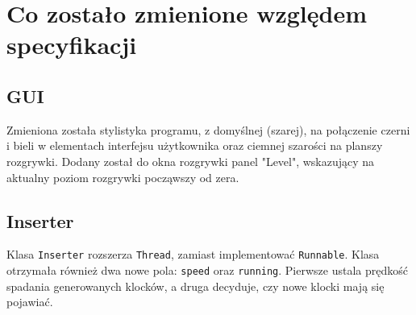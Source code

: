 \documentclass[12pt]{report}
\newcommand{\code}[1]{\texttt{#1}}
\begin{document}
\section{Co zostało zmienione względem specyfikacji}
    
    \subsection{GUI}
      Zmieniona została stylistyka programu, z domyślnej (szarej), na połączenie czerni i bieli w elementach interfejsu użytkownika oraz ciemnej szarości na planszy rozgrywki. Dodany został do okna rozgrywki panel "Level", wskazujący na aktualny poziom rozgrywki począwszy od zera.
      
     \subsection{Inserter}
     Klasa \code{Inserter} rozszerza \code{Thread}, zamiast implementować \code{Runnable}.
     Klasa otrzymała również dwa nowe pola: \code{speed} oraz \code{running}. Pierwsze ustala prędkość spadania generowanych klocków, a druga decyduje, czy nowe klocki mają się pojawiać.
     
\end{document}
